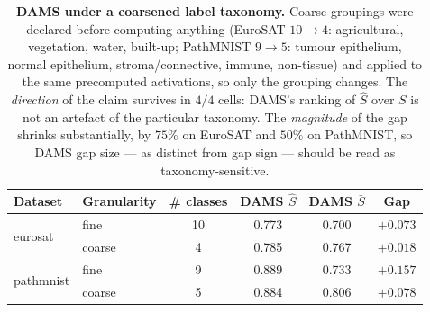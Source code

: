 \begin{table}[htbp]
\centering
\small
\caption{\textbf{DAMS under a coarsened label taxonomy.} Coarse groupings were declared
before computing anything (EuroSAT $10\!\rightarrow\!4$: agricultural, vegetation, water,
built-up; PathMNIST $9\!\rightarrow\!5$: tumour epithelium, normal epithelium,
stroma/connective, immune, non-tissue) and applied to the same precomputed activations,
so only the grouping changes. The \emph{direction} of the claim survives in $4/4$ cells:
DAMS's ranking of $\hat{S}$ over $\bar{S}$ is not an artefact of the particular taxonomy.
The \emph{magnitude} of the gap shrinks substantially, by $75\%$ on EuroSAT and $50\%$ on
PathMNIST, so DAMS gap size --- as distinct from gap sign --- should be read as
taxonomy-sensitive.}
\label{tab:dams_coarsening}
\setlength{\tabcolsep}{6pt}
\begin{tabular}{llcccc}
\toprule
\textbf{Dataset} & \textbf{Granularity} & \textbf{\# classes} & \textbf{DAMS $\hat{S}$} & \textbf{DAMS $\bar{S}$} & \textbf{Gap} \\
\midrule
\multirow{2}{*}{eurosat}
 & fine   & 10 & 0.773 & 0.700 & $+0.073$ \\
 & coarse & \phantom{0}4 & 0.785 & 0.767 & $+0.018$ \\
\midrule
\multirow{2}{*}{pathmnist}
 & fine   & \phantom{0}9 & 0.889 & 0.733 & $+0.157$ \\
 & coarse & \phantom{0}5 & 0.884 & 0.806 & $+0.078$ \\
\bottomrule
\end{tabular}
\end{table}

